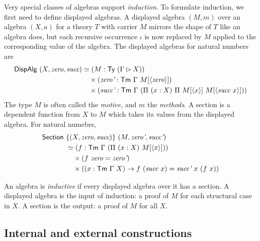 Very special classes of algebras support \emph{induction}.
To formulate induction, we first need to define displayed algebras.
A displayed algebra $(M, m)$ over an algebra $(X, a)$ for a theory $T$ with
carrier $M$ mirrors the shape of $T$ like an algebra does, but each recursive
occurrence $\iota$ is now replaced by $M$ applied to the corresponding value of
the algebra. The displayed algebras for natural numbers are
\begin{align*}
	\mta{DispAlg}\ (X, \textit{zero}, \textit{succ}) & \simeq (M : \Ty\ (\Gamma \rhd X))                                                      \\
	                               & \quad \times (\textit{zero'} : \Tm\ \Gamma\ M[\Msub{\textit{zero}}])                                            \\
	                               & \quad \times (\textit{succ'} : \Tm\ \Gamma\ (\Pi\ (x : X)\ \Pi\ M[\Msub{x}]\ M[\Msub{\textit{succ}\ x}]))
\end{align*}
The type $M$ is often called the \emph{motive}, and $m$ the \emph{methods}.
A section is a dependent function from $X$ to $M$ which takes its values from
the displayed algebra. For natural numebrs,
\begin{align*}
	\mta{Section}\  & \{(X, \textit{zero}, \textit{succ})\}\ (M, \textit{zero'}, \textit{succ'})                                                                                           \\
	                & \simeq (f : \Tm\ \Gamma\ (\Pi\ (x : X)\ M[\Msub x]))                                                                                   \\
	                & \quad \times (f\ \textit{zero} = \textit{zero'})                                                                                        \\
	                & \quad \times ((x : \Tm\ \Gamma\ X) \to f\ (\textit{succ}\ x) = \textit{succ'}\ x\ (f\ x))
\end{align*}

\begin{definition}
An algebra is \emph{inductive} if every displayed algebra over it has a section.
A displayed algebra is the input of induction: a proof of $M$ for each structural case in $X$.
A section is the output: a proof of $M$ for all $X$.
\end{definition}

\subsection{Internal and external constructions}

